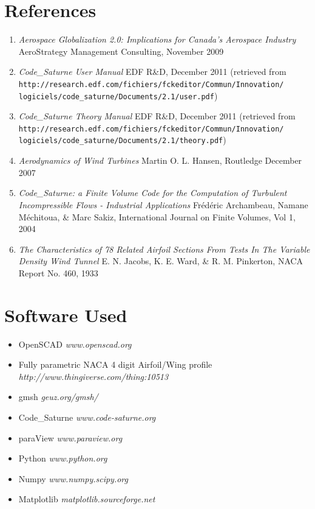 \documentclass[12pt]{article}
\begin{document}
\section*{References}
\begin{enumerate}
\item \textit{Aerospace Globalization 2.0: Implications for Canada's Aerospace
Industry} AeroStrategy Management Consulting, November 2009

\item \textit{Code\_Saturne User Manual} EDF R\&D, December 2011 
(retrieved from\\ 
\verb!http://research.edf.com/fichiers/fckeditor/Commun/Innovation/!\\
\verb!logiciels/code_saturne/Documents/2.1/user.pdf!)

\item \textit{Code\_Saturne Theory Manual} EDF R\&D, December 2011
(retrieved from\\
\verb!http://research.edf.com/fichiers/fckeditor/Commun/Innovation/!\\
\verb!logiciels/code_saturne/Documents/2.1/theory.pdf!)
\item \textit{Aerodynamics of Wind Turbines} Martin O. L. Hansen, Routledge
December 2007

\item \textit{Code\_Saturne: a Finite Volume Code for the Computation of
Turbulent Incompressible Flows - Industrial Applications} Fr\'{e}d\'{e}ric
Archambeau, Namane M\'{e}chitoua, \& Marc Sakiz, International Journal on Finite
Volumes, Vol 1, 2004

\item \textit{The Characteristics of 78 Related Airfoil Sections From Tests In
The Variable Density Wind Tunnel} E. N. Jacobs, K. E. Ward, \& R. M. Pinkerton,
NACA Report No. 460, 1933
\end{enumerate}

\section*{Software Used}
\begin{itemize}
\item OpenSCAD  \textit{www.openscad.org}
\item Fully parametric NACA 4 digit Airfoil/Wing profile 
\textit{http://www.thingiverse.com/thing:10513}
\item gmsh \textit{geuz.org/gmsh/}
\item Code\_Saturne \textit{www.code-saturne.org}
\item paraView \textit{www.paraview.org}
\item Python \textit{www.python.org}
\item Numpy \textit{www.numpy.scipy.org}
\item Matplotlib \textit{matplotlib.sourceforge.net}
\end{itemize}
\end{document}
